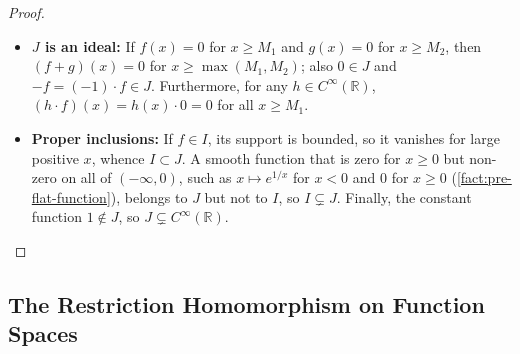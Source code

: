 \begin{content}
\begin{proof}
\begin{itemize}
    \item \textbf{$J$ is an ideal:} If $f(x) = 0$ for $x \ge M_1$ and $g(x) = 0$ for $x \ge M_2$, then $(f+g)(x) = 0$ for $x \ge \max(M_1, M_2)$; also $0 \in J$ and $-f = (-1) \cdot f \in J$. Furthermore, for any $h \in C^\infty(\mathbb{R})$, $(h \cdot f)(x) = h(x) \cdot 0 = 0$ for all $x \ge M_1$.
    \item \textbf{Proper inclusions:} If $f \in I$, its support is bounded, so it vanishes for large positive $x$, whence $I \subset J$. A smooth function that is zero for $x \ge 0$ but non-zero on all of $(-\infty, 0)$, such as $x \mapsto e^{1/x}$ for $x < 0$ and $0$ for $x \ge 0$ (\cref{fact:pre-flat-function}), belongs to $J$ but not to $I$, so $I \subsetneq J$. Finally, the constant function $1 \notin J$, so $J \subsetneq C^\infty(\mathbb{R})$.
\end{itemize}
\end{proof}
\end{content}

\subsection{The Restriction Homomorphism on Function Spaces}


